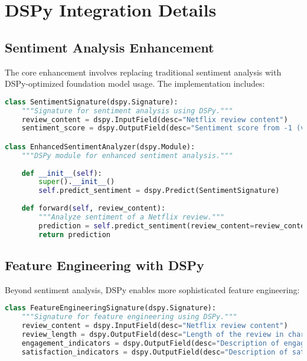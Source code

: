 \documentclass[11pt]{article}
\begin{document}
\section{DSPy Integration Details}

\subsection{Sentiment Analysis Enhancement}

The core enhancement involves replacing traditional sentiment analysis with DSPy-optimized foundation model usage. The implementation includes:

\begin{lstlisting}[language=Python, caption={DSPy Sentiment Analysis Implementation}]
class SentimentSignature(dspy.Signature):
    """Signature for sentiment analysis using DSPy."""
    review_content = dspy.InputField(desc="Netflix review content")
    sentiment_score = dspy.OutputField(desc="Sentiment score from -1 (very negative) to 1 (very positive)")

class EnhancedSentimentAnalyzer(dspy.Module):
    """DSPy module for enhanced sentiment analysis."""
    
    def __init__(self):
        super().__init__()
        self.predict_sentiment = dspy.Predict(SentimentSignature)
    
    def forward(self, review_content):
        """Analyze sentiment of a Netflix review."""
        prediction = self.predict_sentiment(review_content=review_content)
        return prediction
\end{lstlisting}

\subsection{Feature Engineering with DSPy}

Beyond sentiment analysis, DSPy enables more sophisticated feature engineering:

\begin{lstlisting}[language=Python, caption={DSPy Feature Engineering Implementation}]
class FeatureEngineeringSignature(dspy.Signature):
    """Signature for feature engineering using DSPy."""
    review_content = dspy.InputField(desc="Netflix review content")
    review_length = dspy.OutputField(desc="Length of the review in characters")
    engagement_indicators = dspy.OutputField(desc="Description of engagement indicators")
    satisfaction_indicators = dspy.OutputField(desc="Description of satisfaction indicators")
\end{lstlisting}
\end{document}
